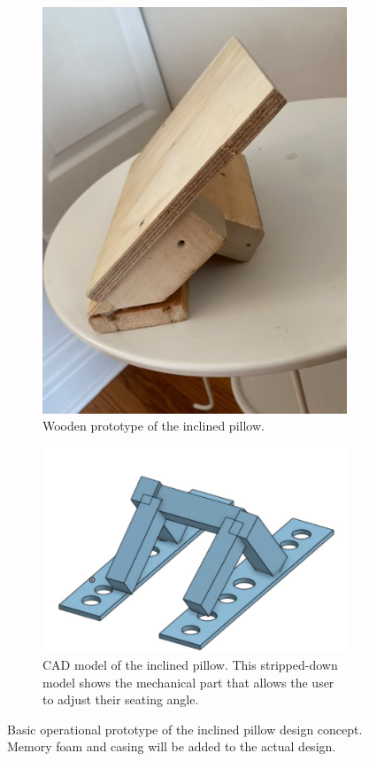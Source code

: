 \documentclass[11pt]{article}
\begin{document}
\begin{figure}[H]
\centering
\begin{subfigure}{.5\linewidth}
  \centering
  \includegraphics[width=0.9\linewidth]{pillow.jpg}
  \caption{Wooden prototype of the inclined pillow.}
\end{subfigure}%
\begin{subfigure}{.5\linewidth}
  \centering
  \includegraphics[width=1.0\linewidth]{CAD.jpg}
  \caption{CAD model of the inclined pillow. This stripped-down model shows the mechanical part that allows the user to adjust their seating angle.}
  \end{subfigure}
\caption{Basic operational prototype of the inclined pillow design concept. Memory foam and casing will be added to the actual design.}
\label{fig:pillow}
\end{figure}
\end{document}
